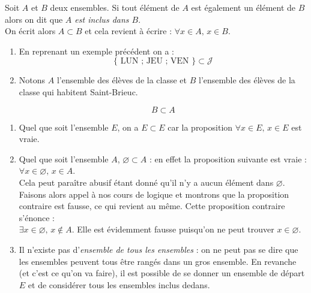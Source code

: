 \documentclass[a4paper,12pt,french]{book}
\let\emptyset\varnothing
\begin{document}
\begin{definition}[ : inclusion]
Soit $A$ et $B$ deux ensembles. Si tout élément de $A$ est également un élément de $B$ alors on dit que \textit{$A$ est inclus dans $B$}.\\
On écrit alors $A\subset B$ et cela revient à écrire : $\forall x\in A,\,x\in B$.
\end{definition}

	\begin{exemple}[s]
			\begin{enumerate}[--]
				\item 	En reprenant un exemple précédent on a :
				 $$\{\text{ LUN ; JEU ; VEN }\}\subset \mathcal{J}$$
				\item 	Notons $A$ l'ensemble des élèves de la classe et $B$ l'ensemble des élèves de la classe qui habitent Saint-Brieuc.\\
				\begin{center}
				\end{center}
				 $$B\subset A$$
			\end{enumerate}
		\end{exemple}
\begin{remarque}[s]
\begin{enumerate}[--]
	\item Quel que soit l'ensemble $E$, on a $E\subset E$ car la proposition $\forall x\in E,\,x\in E$ est vraie.
	\item 	Quel que soit l'ensemble $A$, $\emptyset \subset A$ : en effet la proposition suivante est vraie : $\forall x\in\emptyset,\,x\in A$.\\
	Cela peut paraître abusif étant donné qu'il n'y a aucun élément dans $\emptyset$. Faisons alors appel à nos cours de logique et montrons que la proposition contraire est fausse, ce qui revient au même. Cette proposition contraire s'énonce :\\
	$\exists x\in\emptyset,\,x\notin A$. Elle est évidemment fausse puisqu'on ne peut trouver $x\in\emptyset$.
	\item 	Il n'existe pas d'\textit{ensemble de tous les ensembles} : on ne peut pas se dire que les ensembles peuvent tous être rangés dans un \og gros ensemble\fg{}. En revanche (et c'est ce qu'on va faire), il est possible de se donner un ensemble de départ $E$ et de considérer tous les ensembles inclus dedans.
\end{enumerate}
\end{remarque}
\end{document}
